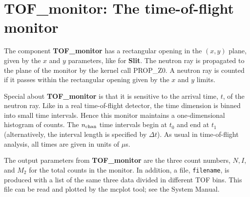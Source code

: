 \section{TOF\_monitor: The time-of-flight monitor}

The component {\bf TOF\_monitor} has a rectangular opening
in the $(x,y)$ plane, given by the $x$ and $y$ parameters,
like for {\bf Slit}.
The neutron ray is propagated to the plane of the monitor
by the kernel call PROP\_Z0.
A neutron ray is counted if it passes within the rectangular opening
given by the $x$ and $y$ limits.

Special about {\bf TOF\_monitor} is that it is sensitive to
the arrival time, $t$, of the neutron ray.
Like in a real time-of-flight detector, the time dimension is
binned into small time intervals.
Hence this monitor maintains a one-dimensional histogram of counts.
The $n_{\rm chan}$ time intervals begin at $t_0$ and
end at $t_1$ (alternatively, the interval length is specified by $\Delta t$).
As usual in time-of-flight analysis, all times are given in units of $\mu$s.

The output parameters from {\bf TOF\_monitor} are the three count numbers,
$N, I$, and $M_2$ for the total counts in the monitor.
In addition, a file, \verb+filename+, is produced with a list of
the same three data divided in different TOF bins.
This file can be read and plotted by the {\rm mcplot} tool; see the
System Manual.

